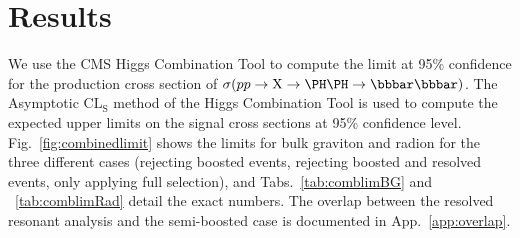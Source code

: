 \section{Results\label{sec:Results}}

We use the CMS Higgs Combination Tool to compute the limit at 95\% confidence for the production cross section of $\sigma(pp\to\XHbbHbb)$. 
The Asymptotic $\mathrm{CL_S}$ method of the Higgs Combination Tool is used to compute the expected upper limits on the signal cross sections at 95\% confidence level. Fig.~\ref{fig:combinedlimit} shows the limits for bulk graviton and radion for the three different cases (rejecting boosted events, rejecting boosted and resolved events, only applying full selection), and Tabs.~\ref{tab:comblimBG} and ~\ref{tab:comblimRad} detail the exact numbers. The overlap between the resolved resonant analysis and the semi-boosted case is documented in App.~\ref{app:overlap}.

